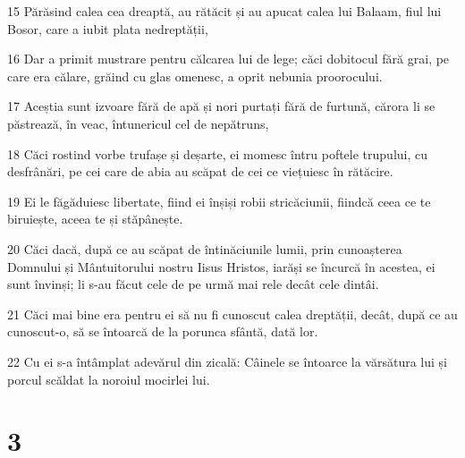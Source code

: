 \par 15 Părăsind calea cea dreaptă, au rătăcit și au apucat calea lui Balaam, fiul lui Bosor, care a iubit plata nedreptății,
\par 16 Dar a primit mustrare pentru călcarea lui de lege; căci dobitocul fără grai, pe care era călare, grăind cu glas omenesc, a oprit nebunia proorocului.
\par 17 Aceștia sunt izvoare fără de apă și nori purtați fără de furtună, cărora li se păstrează, în veac, întunericul cel de nepătruns,
\par 18 Căci rostind vorbe trufașe și deșarte, ei momesc întru poftele trupului, cu desfrânări, pe cei care de abia au scăpat de cei ce viețuiesc în rătăcire.
\par 19 Ei le făgăduiesc libertate, fiind ei înșiși robii stricăciunii, fiindcă ceea ce te biruiește, aceea te și stăpânește.
\par 20 Căci dacă, după ce au scăpat de întinăciunile lumii, prin cunoașterea Domnului și Mântuitorului nostru Iisus Hristos, iarăși se încurcă în acestea, ei sunt învinși; li s-au făcut cele de pe urmă mai rele decât cele dintâi.
\par 21 Căci mai bine era pentru ei să nu fi cunoscut calea dreptății, decât, după ce au cunoscut-o, să se întoarcă de la porunca sfântă, dată lor.
\par 22 Cu ei s-a întâmplat adevărul din zicală: Câinele se întoarce la vărsătura lui și porcul scăldat la noroiul mocirlei lui.

\chapter{3}

